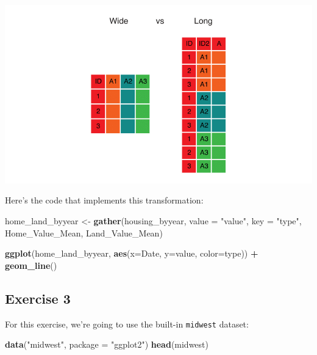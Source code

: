 \documentclass[
]{book}
\newenvironment{Shaded}{\begin{snugshade}}{\end{snugshade}}
\newcommand{\DataTypeTok}[1]{\textcolor[rgb]{0.13,0.29,0.53}{#1}}
\newcommand{\KeywordTok}[1]{\textcolor[rgb]{0.13,0.29,0.53}{\textbf{#1}}}
\newcommand{\NormalTok}[1]{#1}
\newcommand{\OperatorTok}[1]{\textcolor[rgb]{0.81,0.36,0.00}{\textbf{#1}}}
\newcommand{\StringTok}[1]{\textcolor[rgb]{0.31,0.60,0.02}{#1}}
\begin{document}
\includegraphics{R/Rgraphics/images/wide_vs_long.png}

Here's the code that implements this transformation:

\begin{Shaded}
\begin{Highlighting}[]
\NormalTok{home_land_byyear <-}\StringTok{ }\KeywordTok{gather}\NormalTok{(housing_byyear,}
                           \DataTypeTok{value =} \StringTok{"value"}\NormalTok{,}
                           \DataTypeTok{key =} \StringTok{"type"}\NormalTok{,}
\NormalTok{                           Home_Value_Mean, Land_Value_Mean)}

\KeywordTok{ggplot}\NormalTok{(home_land_byyear, }\KeywordTok{aes}\NormalTok{(}\DataTypeTok{x=}\NormalTok{Date, }\DataTypeTok{y=}\NormalTok{value, }\DataTypeTok{color=}\NormalTok{type)) }\OperatorTok{+}
\StringTok{  }\KeywordTok{geom_line}\NormalTok{()}
\end{Highlighting}
\end{Shaded}

\hypertarget{exercise-3-2}{%
\subsection{Exercise 3}\label{exercise-3-2}}

For this exercise, we're going to use the built-in \texttt{midwest} dataset:

\begin{Shaded}
\begin{Highlighting}[]
\KeywordTok{data}\NormalTok{(}\StringTok{"midwest"}\NormalTok{, }\DataTypeTok{package =} \StringTok{"ggplot2"}\NormalTok{)}
\KeywordTok{head}\NormalTok{(midwest)}
\end{Highlighting}
\end{Shaded}
\end{document}
